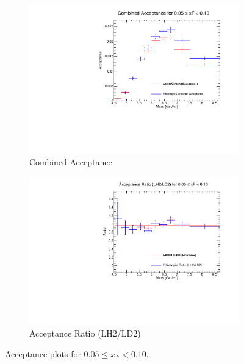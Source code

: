 \documentclass[11pt]{article}
\begin{document}
\begin{figure}[p]
\begin{subfigure}[b]{0.48\textwidth}
       \includegraphics[width=\linewidth]{./acceptancePlots/Combined_acceptance_xF_bin_1.pdf}
       \caption{Combined Acceptance}
    \end{subfigure}\hfill
    \begin{subfigure}[b]{0.48\textwidth}
       \includegraphics[width=\linewidth]{./acceptancePlots/Acceptance_ratio_xF_bin_1.pdf}
       \caption{Acceptance Ratio (LH2/LD2)}
    \end{subfigure}
    \caption{Acceptance plots for $0.05 \le x_F < 0.10$.}
\end{figure}
\end{document}
